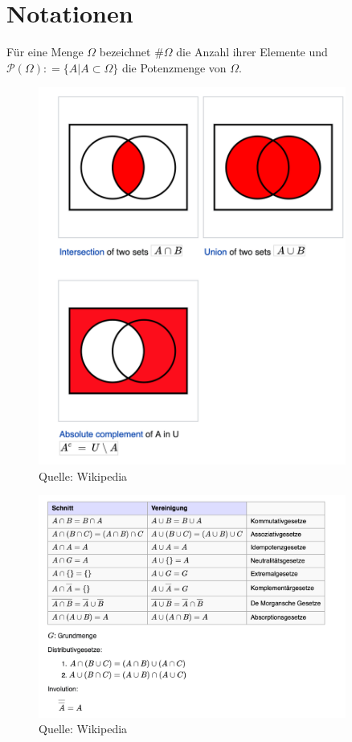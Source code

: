 
\section{Notationen}

Für eine Menge $\Omega$ bezeichnet $\# \Omega$ die Anzahl ihrer Elemente und $\mathcal{P} (\Omega) : = \{ A | A \subset \Omega \}$ die Potenzmenge von $\Omega$. 


\begin{figure}[htp]
      \centering
    \includegraphics[width=0.9\textwidth]{images/Venn}

      \caption{Quelle: Wikipedia}
\end{figure}


\begin{figure}[htp]
      \centering
    \includegraphics[width=0.9\textwidth]{images/mengengesetze}

      \caption{Quelle: Wikipedia}
\end{figure}



\newpage